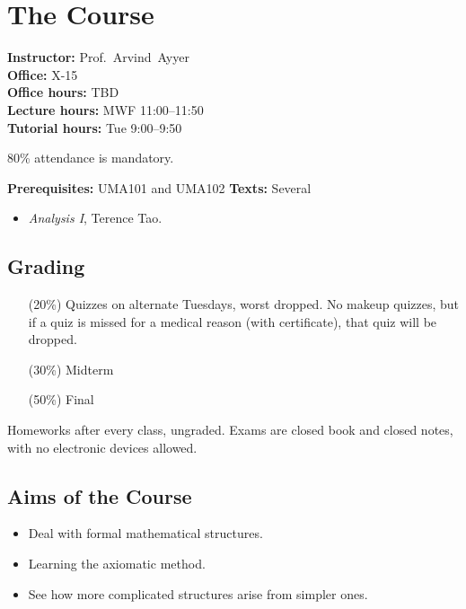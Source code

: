 
\chapter*{The Course} \label{sec:course}
\textbf{Instructor:} Prof.~Arvind~Ayyer\\
\textbf{Office:} X-15\\
\textbf{Office hours:} TBD\\
\textbf{Lecture hours:} MWF 11:00--11:50\\
\textbf{Tutorial hours:} Tue 9:00--9:50

80\% attendance is mandatory.

\textbf{Prerequisites:} UMA101 and UMA102
\textbf{Texts:} Several
\begin{itemize}
    \item \textit{Analysis I}, Terence Tao.
\end{itemize}

\section*{Grading} \label{sec:grading}
\begin{itemize}
    \item[(20\%)] Quizzes on alternate Tuesdays, worst dropped.
    No makeup quizzes, but if a quiz is missed for a medical reason
    (with certificate), that quiz will be dropped.
    \item[(30\%)] Midterm
    \item[(50\%)] Final
\end{itemize}
Homeworks after every class, ungraded.
Exams are closed book and closed notes, with no electronic devices allowed.

\section*{Aims of the Course} \label{sec:aims}
\begin{itemize}
    \item Deal with formal mathematical structures.
    \item Learning the axiomatic method.
    \item See how more complicated structures arise from simpler ones.
\end{itemize}

